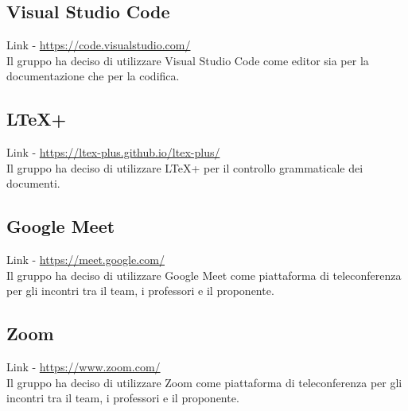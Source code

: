 \subsection{Visual Studio Code}
\label{subsection:visual_studio_code}
Link - \href{https://code.visualstudio.com/}{https://code.visualstudio.com/} \\
Il gruppo ha deciso di utilizzare Visual Studio Code come editor sia per la documentazione che per la codifica.

\subsection{LTeX+}
\label{subsection:ltex+}
Link - \href{https://ltex-plus.github.io/ltex-plus/}{https://ltex-plus.github.io/ltex-plus/} \\
Il gruppo ha deciso di utilizzare LTeX+ per il controllo grammaticale dei documenti.

\subsection{Google Meet}
\label{subsection:google_meet}
Link - \href{https://meet.google.com/}{https://meet.google.com/} \\
Il gruppo ha deciso di utilizzare Google Meet come piattaforma di teleconferenza per gli incontri tra il team, i professori e il proponente.

\subsection{Zoom}
\label{subsection:zoom}
Link - \href{https://www.zoom.com/}{https://www.zoom.com/} \\
Il gruppo ha deciso di utilizzare Zoom come piattaforma di teleconferenza per gli incontri tra il team, i professori e il proponente.

